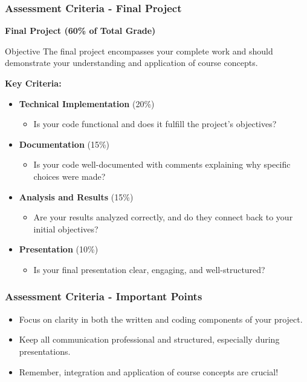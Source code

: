 \documentclass[aspectratio=169]{beamer}
\begin{document}
\begin{frame}[fragile]
    \frametitle{Assessment Criteria - Final Project}
    \textbf{Final Project (60\% of Total Grade)}

    \begin{block}{Objective}
        The final project encompasses your complete work and should demonstrate your understanding and application of course concepts.
    \end{block}

    \textbf{Key Criteria:}
    \begin{itemize}
        \item \textbf{Technical Implementation} (20\%)
        \begin{itemize}
            \item Is your code functional and does it fulfill the project's objectives?
        \end{itemize}
        \item \textbf{Documentation} (15\%)
        \begin{itemize}
            \item Is your code well-documented with comments explaining why specific choices were made?
        \end{itemize}
        \item \textbf{Analysis and Results} (15\%)
        \begin{itemize}
            \item Are your results analyzed correctly, and do they connect back to your initial objectives?
        \end{itemize}
        \item \textbf{Presentation} (10\%)
        \begin{itemize}
            \item Is your final presentation clear, engaging, and well-structured?
        \end{itemize}
    \end{itemize}
\end{frame}

\begin{frame}[fragile]
    \frametitle{Assessment Criteria - Important Points}
    \begin{itemize}
        \item Focus on clarity in both the written and coding components of your project.
        \item Keep all communication professional and structured, especially during presentations.
        \item Remember, integration and application of course concepts are crucial!
    \end{itemize}
\end{frame}
\end{document}
